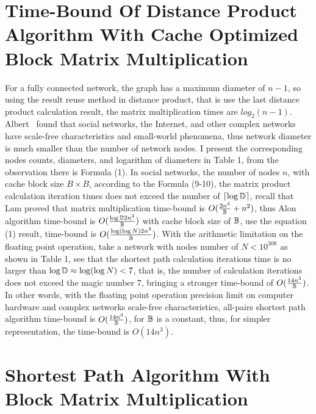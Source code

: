 \documentclass[review]{cvpr}
\begin{document}

\section{Time-Bound Of Distance Product Algorithm With Cache Optimized Block Matrix Multiplication}

For a fully connected network, the graph has a maximum diameter of $n-1$, so using the result reuse method in distance product, that is use the last distance product calculation result, the matrix multiplication times are $log_2(n-1)$.
Albert~\cite{albert1999diameter} found that social networks, the Internet, and other complex networks have scale-free characteristics and small-world phenomena, thus network diameter is much smaller than the number of network nodes.
I present the corresponding nodes counts, diameters, and logarithm of diameters in Table 1, from the observation there is Formula (1).
In social networks, the number of nodes $n$, with cache block size $B\times B$, according to the Formula (9-10), the matrix product calculation iteration times does not exceed the number of $\lceil{\log{\Bbb D}}\rceil$, recall that Lam \etal proved that matrix multiplication time-bound is \(O({2n^3 \over \Bbb B}+{n^2})\),
thus Alon \etal algorithm time-bound is \(O({\log{\Bbb D}2n^3\over{ \Bbb B}})\) with cache block size of $\Bbb B$, use the equation (1) result, time-bound is \(O({\log(\log{N})2n^3\over \Bbb B})\).
With the arithmetic limitation on the floating point operation, \eg take a network with nodes number of $N<10^{308}$
as shown in Table 1, see that the shortest path calculation iterations time is no larger than $\log{\Bbb D} \approx \log(\log{N})<7$, that is, the number of calculation iterations does not exceed the magic number $7$,
bringing a stronger time-bound of \(O({14n^3\over {\Bbb B}})\).
In other words, with the floating point operation precision limit on computer hardware and complex networks scale-free characteristics, all-pairs shortest path algorithm time-bound is \(O({14n^3\over \Bbb B})\), for $\Bbb B$ is a constant, thus, for simpler representation, the time-bound is \(O(14n^3)\).




\section{Shortest Path Algorithm With Block Matrix Multiplication}
\end{document}

